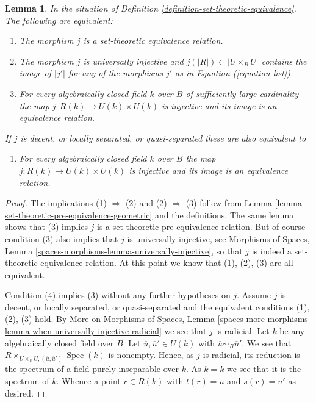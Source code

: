 \documentclass{stacks-project}
\theoremstyle{plain}
\newtheorem{lemma}[subsection]{Lemma}
\theoremstyle{definition}
\theoremstyle{remark}
\numberwithin{equation}{subsection}
\def\Spec{\mathop{\mathrm{Spec}}}
\begin{document}
\begin{lemma}
\label{lemma-set-theoretic-equivalence-geometric}
In the situation of Definition \ref{definition-set-theoretic-equivalence}.
The following are equivalent:
\begin{enumerate}
\item The morphism $j$ is a set-theoretic equivalence relation.
\item The morphism $j$ is universally injective and
$j(|R|) \subset |U \times_B U|$ contains the image of
$|j'|$ for any of the morphisms $j'$ as in Equation (\ref{equation-list}).
\item For every algebraically closed field $k$ over $B$ of sufficiently large
cardinality the map $j : R(k) \to U(k) \times U(k)$ is injective and
its image is an equivalence relation.
\end{enumerate}
If $j$ is decent, or locally separated, or quasi-separated
these are also equivalent to
\begin{enumerate}
\item[(4)] For every algebraically closed field $k$ over $B$
the map $j : R(k) \to U(k) \times U(k)$ is injective and its image
is an equivalence relation.
\end{enumerate}
\end{lemma}

\begin{proof}
The implications (1) $\Rightarrow$ (2) and (2) $\Rightarrow$ (3) follow from
Lemma \ref{lemma-set-theoretic-pre-equivalence-geometric}
and the definitions. The same lemma shows that (3) implies
$j$ is a set-theoretic pre-equivalence relation. But of course condition
(3) also implies that $j$ is universally injective, see
Morphisms of Spaces, Lemma \ref{spaces-morphisms-lemma-universally-injective},
so that $j$ is indeed a set-theoretic equivalence relation.
At this point we know that (1), (2), (3) are all equivalent.

\medskip\noindent
Condition (4) implies (3) without any further hypotheses on $j$. Assume $j$
is decent, or locally separated, or quasi-separated and the equivalent
conditions (1), (2), (3) hold. By
More on Morphisms of Spaces,
Lemma \ref{spaces-more-morphisms-lemma-when-universally-injective-radicial}
we see that $j$ is radicial.
Let $k$ be any algebraically closed field over $B$. Let
$\overline{u}, \overline{u}' \in U(k)$ with
$\overline{u} \sim_R \overline{u}'$. We see that
$R \times_{U \times_B U, (\overline{u}, \overline{u}')} \Spec(k)$
is nonempty. Hence, as $j$ is radicial, its reduction is the spectrum of a
field purely inseparable over $k$. As $k = \overline{k}$ we see that
it is the spectrum of $k$. Whence a point $\overline{r} \in R(k)$
with $t(\overline{r}) = \overline{u}$ and $s(\overline{r}) = \overline{u}'$
as desired.
\end{proof}
\end{document}
